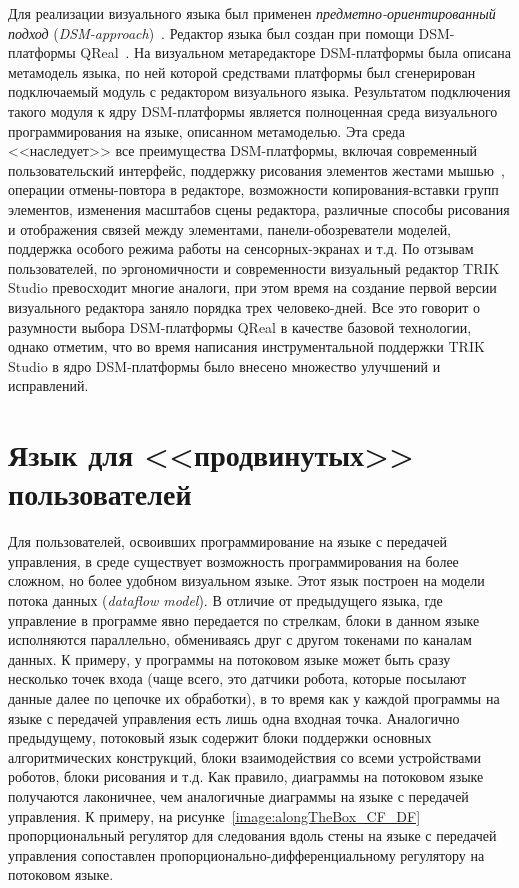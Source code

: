 \documentclass[a5paper]{article}
\begin{document}
Для реализации визуального языка был применен \textit{предметно-ориентированный подход} (\textit{DSM-approach})~\cite{koznov2008}. Редактор языка был создан при помощи DSM-платформы QReal~\cite{qrealMeta,kuzenkova2013qreal}. На визуальном метаредакторе DSM-платформы была описана метамодель языка, по ней которой средствами платформы был сгенерирован подключаемый модуль с редактором визуального языка. Результатом подключения такого модуля к ядру DSM-платформы является полноценная среда визуального программирования на языке, описанном метамоделью. Эта среда <<наследует>> все преимущества DSM-платформы, включая современный пользовательский интерфейс, поддержку рисования элементов жестами мышью~\cite{osechkina2010gestures,osechkina2012multistroke}, операции отмены-повтора в редакторе, возможности копирования-вставки групп элементов, изменения масштабов сцены редактора, различные способы рисования и отображения связей между элементами, панели-обозреватели моделей, поддержка особого режима работы на сенсорных-экранах и т.д. По отзывам пользователей, по эргономичности и современности визуальный редактор TRIK Studio превосходит многие аналоги, при этом время на создание первой версии визуального редактора заняло порядка трех человеко-дней. Все это говорит о разумности выбора DSM-платформы QReal в качестве базовой технологии, однако отметим, что во время написания инструментальной поддержки TRIK Studio в ядро DSM-платформы было внесено множество улучшений и исправлений.

\section{Язык для <<продвинутых>> пользователей}
\label{chapter:dataFlowLanguage}

Для пользователей, освоивших программирование на языке с передачей управления, в среде существует возможность программирования на более сложном, но более удобном визуальном языке. Этот язык построен на модели потока данных (\textit{dataflow model}). В отличие от предыдущего языка, где управление в программе явно передается по стрелкам, блоки в данном языке исполняются параллельно, обмениваясь друг с другом токенами по каналам данных. К примеру, у программы на потоковом языке может быть сразу несколько точек входа (чаще всего, это датчики робота, которые посылают данные далее по цепочке их обработки), в то время как у каждой программы на языке с передачей управления есть лишь одна входная точка. Аналогично предыдущему, потоковый язык содержит блоки поддержки основных алгоритмических конструкций, блоки взаимодействия со всеми устройствами роботов, блоки рисования и т.д. Как правило, диаграммы на потоковом языке получаются лаконичнее, чем аналогичные диаграммы на языке с передачей управления. К примеру, на рисунке~\ref{image:alongTheBox_CF_DF} пропорциональный регулятор для следования вдоль стены на языке с передачей управления сопоставлен пропорционально-дифференциальному регулятору на потоковом языке.
\end{document}
